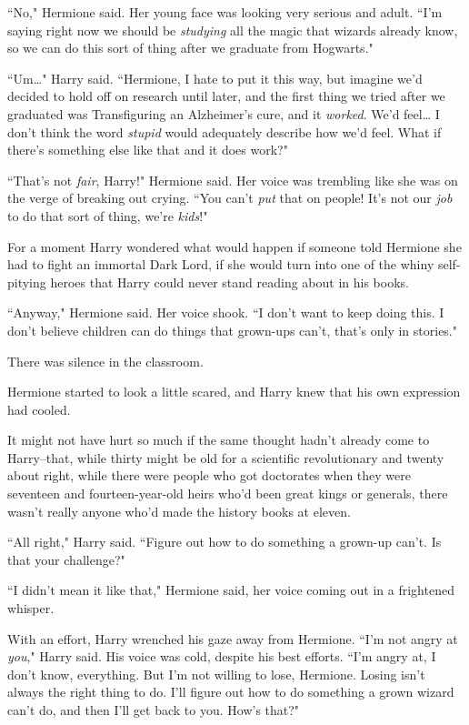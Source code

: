 ``No," Hermione said. Her young face was looking very serious and adult. ``I'm saying right now we should be \emph{studying} all the magic that wizards already know, so we can do this sort of thing after we graduate from Hogwarts."

``Um{\ldots}" Harry said. ``Hermione, I hate to put it this way, but imagine we'd decided to hold off on research until later, and the first thing we tried after we graduated was Transfiguring an Alzheimer's cure, and it \emph{worked}. We'd feel{\ldots} I don't think the word \emph{stupid} would adequately describe how we'd feel. What if there's something else like that and it does work?"

``That's not \emph{fair}, Harry!" Hermione said. Her voice was trembling like she was on the verge of breaking out crying. ``You can't \emph{put} that on people! It's not our \emph{job} to do that sort of thing, we're \emph{kids}!"

For a moment Harry wondered what would happen if someone told Hermione she had to fight an immortal Dark Lord, if she would turn into one of the whiny self-pitying heroes that Harry could never stand reading about in his books.

``Anyway," Hermione said. Her voice shook. ``I don't want to keep doing this. I don't believe children can do things that grown-ups can't, that's only in stories."

There was silence in the classroom.

Hermione started to look a little scared, and Harry knew that his own expression had cooled.

It might not have hurt so much if the same thought hadn't already come to Harry\---that, while thirty might be old for a scientific revolutionary and twenty about right, while there were people who got doctorates when they were seventeen and fourteen-year-old heirs who'd been great kings or generals, there wasn't really anyone who'd made the history books at eleven.

``All right," Harry said. ``Figure out how to do something a grown-up can't. Is that your challenge?"

``I didn't mean it like that," Hermione said, her voice coming out in a frightened whisper.

With an effort, Harry wrenched his gaze away from Hermione. ``I'm not angry at \emph{you}," Harry said. His voice was cold, despite his best efforts. ``I'm angry at, I don't know, everything. But I'm not willing to lose, Hermione. Losing isn't always the right thing to do. I'll figure out how to do something a grown wizard can't do, and then I'll get back to you. How's that?"

